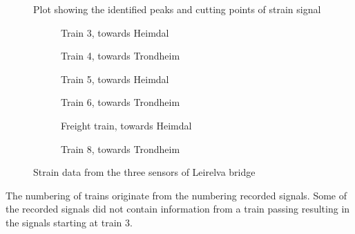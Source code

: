 \begin{figure}
	\begin{adjustbox}{center}
		
	\end{adjustbox}
	\caption{Plot showing the identified peaks and cutting points of strain signal}
	\label{fig:cutting_points}
\end{figure}
\begin{figure}
	\centering
	\begin{subfigure}[t]{0.4\textwidth}
		\centering
		
		\caption{Train 3, towards Heimdal}
		\label{fig:strain_train3}
	\end{subfigure}
	\qquad
	\begin{subfigure}[t]{0.4\textwidth}
		\centering
		
		\caption{Train 4, towards Trondheim}
		\label{fig:strain_train4}
	\end{subfigure}
	\begin{subfigure}[t]{0.4\textwidth}
		\centering
		
		\caption{Train 5, towards Heimdal}
		\label{fig:strain_train5}
	\end{subfigure}
	\qquad
  \begin{subfigure}[t]{0.4\textwidth}
    \centering
    
		\caption{Train 6, towards Trondheim}
    \label{fig:strain_train6}
  \end{subfigure}
  \begin{subfigure}[t]{0.4\textwidth}
    \centering
    
		\caption{Freight train, towards Heimdal}
    \label{fig:strain_train7}
  \end{subfigure}
    \qquad
	\begin{subfigure}[t]{0.4\textwidth}
		\centering
		
		\caption{Train 8, towards Trondheim}
		\label{fig:strain_train8}
	\end{subfigure}
  \caption{Strain data from the three sensors of Leirelva bridge}
  \label{fig:strain_all}
\end{figure}
The numbering of trains originate from the numbering recorded signals. Some of the recorded signals did not contain information from a train passing resulting in the signals starting at train 3.
